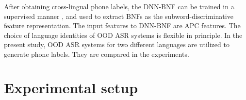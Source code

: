 \documentclass[a4paper]{article}
\begin{document}

After obtaining cross-lingual  phone labels, the DNN-BNF can be trained in a supervised manner \cite{grezl2007probabilistic}, and used to  extract BNFs   as the subword-discriminative feature representation. 
The input features to DNN-BNF are APC features. 
The choice of language identities of OOD ASR systems is flexible in principle. 
In the present study, OOD ASR systems for two different languages are utilized to generate phone labels. They are compared in the experiments.


\section{Experimental setup}
\end{document}
